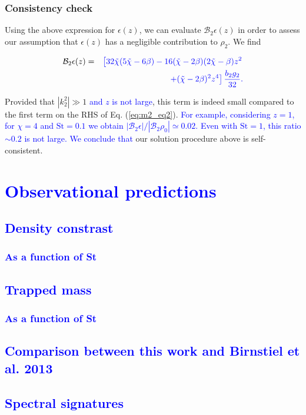 \documentclass[apj]{emulateapj}
\def\blue#1{\textcolor{blue}{#1}}
\newcommand{\Eq}[1]{Eq. (\ref{#1})}
\newcommand{\eq}[1]{\Eq{#1}}
\newcommand{\beqn}{\begin{eqnarray}}
\newcommand{\eeqn}{\end{eqnarray}}
\newcommand{\tilchi}{\tilde\chi}
\begin{document}
\subsubsection{Consistency check}
Using the above expression for $\epsilon(z)$, we can evaluate
$\mathcal{B}_2\epsilon(z)$ in order to assess our assumption that
$\epsilon(z)$ has a negligible contribution to $\rho_2$. We find

\beqn
\mathcal{B}_2\epsilon(z) =&& \blue{\left[32\tilchi(5\tilchi - 6\beta)-16(\tilchi-2\beta)(2\tilchi-\beta)z^2
\right.\notag}\\&&\blue{\left.+(\tilchi - 2\beta)^2z^4\right]\frac{b_2g_2}{32}.}
\eeqn

Provided that $|k_2^2|\gg1$ \blue{and $z$ is not large},  
this term is indeed small compared to the first term on the RHS of \eq{eq:m2_eq2}.  \blue{For example, considering $z=1$, 
for $\chi=4$ and $\mathrm{St}=0.1$ we obtain $|\mathcal{B}_2\epsilon|/|\mathcal{B}_2\rho_0|\simeq0.02$. 
Even with $\mathrm{St}=1$, this ratio $\sim0.2$ is not large. We
conclude that}  our solution procedure above is self-consistent.

\section{\blue{Observational predictions}}

\subsection{\blue{Density constrast}}
\subsubsection{\blue{As a function of St}}

\subsection{\blue{Trapped mass}}
\subsubsection{\blue{As a function of St}}

\subsection{\blue{Comparison between this work and Birnstiel et
    al. 2013}}

\subsection{\blue{Spectral signatures}}
\end{document}
